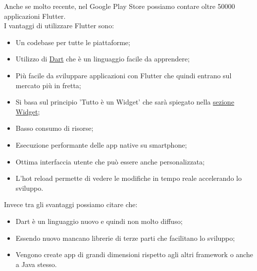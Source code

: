 \newpage
Anche se molto recente, nel Google Play Store possiamo contare oltre 50000 applicazioni Flutter.\\
I vantaggi di utilizzare Flutter sono:
\begin{itemize}
	\item Un codebase per tutte le piattaforme; 
	\item Utilizzo di \hyperref[sec:Dart]{Dart} che è un linguaggio facile da apprendere;  
	\item Più facile da sviluppare applicazioni con Flutter che quindi entrano sul mercato più in fretta;
	\item Si basa sul principio 'Tutto è un Widget' che sarà spiegato nella \hyperref[sec:Widget]{sezione Widget};
	\item Basso consumo di risorse;
	\item Esecuzione performante delle app native su smartphone;
	\item Ottima interfaccia utente che può essere anche personalizzata;
	\item L’hot reload permette di vedere le modifiche in tempo reale accelerando lo sviluppo.\\
\end{itemize}
Invece tra gli svantaggi possiamo citare che:
\begin{itemize}
	\item Dart è un linguaggio nuovo e quindi non molto diffuso; 
	\item Essendo nuovo mancano librerie di terze parti che facilitano lo sviluppo;  
	\item Vengono create app di grandi dimensioni rispetto agli altri framework o anche a Java stesso.\\
\end{itemize}
